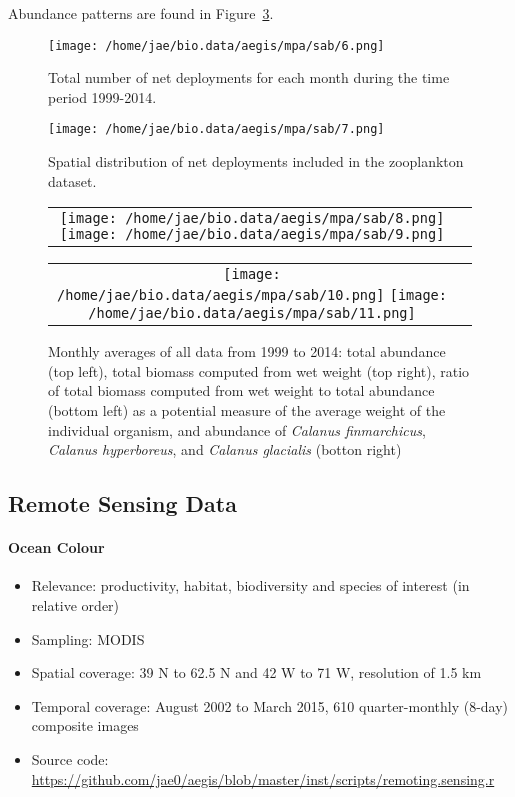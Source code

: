 \documentclass[letterpaper,portrait,11pt]{scrartcl}
\numberwithin{equation}{section}    %
\numberwithin{figure}{section}    %
\numberwithin{table}{section}       %
\begin{document}
Abundance patterns are found in Figure~\ref{fig:AZMPBiomassMonthly}.

\begin{figure}[h]
  \centering
  \texttt{[image: /home/jae/bio.data/aegis/mpa/sab/6.png]}
  \caption{Total number of net deployments for each month during the time period 1999-2014.}
  \label{fig:AZMPdeploymentsMonthly}
\end{figure}

\begin{figure}[h]
  \centering
  \texttt{[image: /home/jae/bio.data/aegis/mpa/sab/7.png]}
  \caption{Spatial distribution of net deployments included in the zooplankton dataset. }
  \label{fig:AZMPdeploymentsMonthlyMap}
\end{figure}

\begin{figure}[h]
  \centering
  \begin{tabular}{cc}
      \texttt{[image: /home/jae/bio.data/aegis/mpa/sab/8.png]}
      \texttt{[image: /home/jae/bio.data/aegis/mpa/sab/9.png]}
  \end{tabular}
  \begin{tabular}{cc}
      \texttt{[image: /home/jae/bio.data/aegis/mpa/sab/10.png]}
      \texttt{[image: /home/jae/bio.data/aegis/mpa/sab/11.png]}
  \end{tabular}
  \caption{Monthly averages of all data from 1999 to 2014: total abundance (top left), total biomass computed from wet weight (top right), ratio of total biomass computed from wet weight  to total abundance (bottom left) as a potential measure of the average weight of the individual organism, and abundance of \textit{Calanus finmarchicus}, \textit{Calanus hyperboreus}, and \textit{Calanus glacialis} (botton right) }
  \label{fig:AZMPBiomassMonthly}
\end{figure}

\afterpage{\clearpage}
\subsection{Remote Sensing Data}

\paragraph{Ocean Colour}

\begin{itemize}
  \item Relevance:  productivity, habitat, biodiversity and species of interest (in relative order)
  \item Sampling:  MODIS
  \item Spatial coverage: 39 N to 62.5 N and 42 W to 71 W, resolution of 1.5 km
  \item Temporal coverage: August 2002 to March 2015, 610 quarter-monthly (8-day) composite  images
  \item Source code: \url{https://github.com/jae0/aegis/blob/master/inst/scripts/remoting.sensing.r}
\end{itemize}
\end{document}

